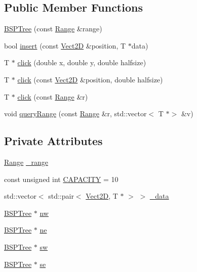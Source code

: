 \subsection*{Public Member Functions}
\begin{DoxyCompactItemize}
\item 
\hyperlink{classBSPTree_ac0d5688da625398b735b724afa22891c_ac0d5688da625398b735b724afa22891c}{B\+S\+P\+Tree} (const \hyperlink{classRange}{Range} \&range)
\item 
bool \hyperlink{classBSPTree_ac4d6edf03e621e59e96b27b4943d304c_ac4d6edf03e621e59e96b27b4943d304c}{insert} (const \hyperlink{classVect2D}{Vect2D} \&position, T $\ast$data)
\item 
T $\ast$ \hyperlink{classBSPTree_a3f713d6aeb66e8b1c1f35f06d49edcf1_a3f713d6aeb66e8b1c1f35f06d49edcf1}{click} (double x, double y, double halfsize)
\item 
T $\ast$ \hyperlink{classBSPTree_a442f2b98cf404a7467daea83fda59d9e_a442f2b98cf404a7467daea83fda59d9e}{click} (const \hyperlink{classVect2D}{Vect2D} \&position, double halfsize)
\item 
T $\ast$ \hyperlink{classBSPTree_a5dca4c571d2ad30c13b90710ad479df3_a5dca4c571d2ad30c13b90710ad479df3}{click} (const \hyperlink{classRange}{Range} \&r)
\item 
void \hyperlink{classBSPTree_a05d3d440bd02e164f450ef26fd94a2d9_a05d3d440bd02e164f450ef26fd94a2d9}{query\+Range} (const \hyperlink{classRange}{Range} \&r, std\+::vector$<$ T $\ast$$>$ \&v)
\end{DoxyCompactItemize}
\subsection*{Private Attributes}
\begin{DoxyCompactItemize}
\item 
\hyperlink{classRange}{Range} \hyperlink{classBSPTree_a9af2e4216eb728b7135b197b0e1c4dea_a9af2e4216eb728b7135b197b0e1c4dea}{\+\_\+range}
\item 
const unsigned int \hyperlink{classBSPTree_ac25b3f64ce4f4e49398978cab2382109_ac25b3f64ce4f4e49398978cab2382109}{C\+A\+P\+A\+C\+I\+TY} = 10
\item 
std\+::vector$<$ std\+::pair$<$ \hyperlink{classVect2D}{Vect2D}, T $\ast$ $>$ $>$ \hyperlink{classBSPTree_af60e625922e4eeb8647f5cd07d28dddd_af60e625922e4eeb8647f5cd07d28dddd}{\+\_\+data}
\item 
\hyperlink{classBSPTree}{B\+S\+P\+Tree} $\ast$ \hyperlink{classBSPTree_a1569e87d368a255fd0f9ba00ebae7949_a1569e87d368a255fd0f9ba00ebae7949}{nw}
\item 
\hyperlink{classBSPTree}{B\+S\+P\+Tree} $\ast$ \hyperlink{classBSPTree_aff1f52f86167389c6f35c03dcdda96b5_aff1f52f86167389c6f35c03dcdda96b5}{ne}
\item 
\hyperlink{classBSPTree}{B\+S\+P\+Tree} $\ast$ \hyperlink{classBSPTree_ae93464ee431a9bfdc211bb622b69342e_ae93464ee431a9bfdc211bb622b69342e}{sw}
\item 
\hyperlink{classBSPTree}{B\+S\+P\+Tree} $\ast$ \hyperlink{classBSPTree_a7f3b004aa986f92ab37af1069a7f1d0b_a7f3b004aa986f92ab37af1069a7f1d0b}{se}
\end{DoxyCompactItemize}


